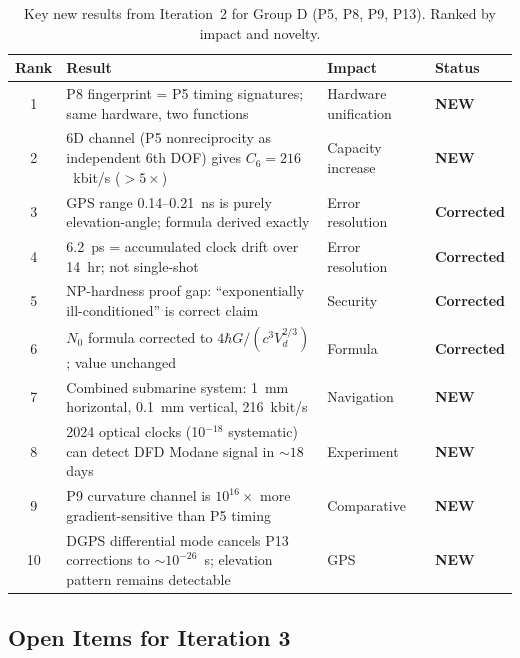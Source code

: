 \documentclass[aps,prd,twocolumn,superscriptaddress,nofootinbib]{revtex4-2}
\begin{document}
\begin{table}[t]
\caption{Key new results from Iteration~2 for Group D (P5, P8, P9, P13).
Ranked by impact and novelty.}
\begin{ruledtabular}
\begin{tabular}{clll}
Rank & Result & Impact & Status \\
\hline
1 & P8 fingerprint = P5 timing signatures; same hardware, two functions &
Hardware unification & \textbf{NEW} \\
2 & 6D channel (P5 nonreciprocity as independent 6th DOF) gives $C_6 = 216$~kbit/s
($> 5\times$) & Capacity increase & \textbf{NEW} \\
3 & GPS range 0.14--0.21~ns is purely elevation-angle; formula derived exactly &
Error resolution & \textbf{Corrected} \\
4 & 6.2~ps = accumulated clock drift over 14~hr; not single-shot & Error resolution &
\textbf{Corrected} \\
5 & NP-hardness proof gap: ``exponentially ill-conditioned'' is correct claim &
Security & \textbf{Corrected} \\
6 & $N_0$ formula corrected to $4\hbar G/(c^3 V_d^{2/3})$; value unchanged &
Formula & \textbf{Corrected} \\
7 & Combined submarine system: 1~mm horizontal, 0.1~mm vertical, 216~kbit/s &
Navigation & \textbf{NEW} \\
8 & 2024 optical clocks (10$^{-18}$ systematic) can detect DFD Modane signal
in $\sim 18$ days & Experiment & \textbf{NEW} \\
9 & P9 curvature channel is $10^{16}\times$ more gradient-sensitive than P5 timing &
Comparative & \textbf{NEW} \\
10 & DGPS differential mode cancels P13 corrections to $\sim 10^{-26}$~s;
elevation pattern remains detectable & GPS & \textbf{NEW} \\
\end{tabular}
\end{ruledtabular}
\end{table}

\subsection{Open Items for Iteration 3}
\end{document}
